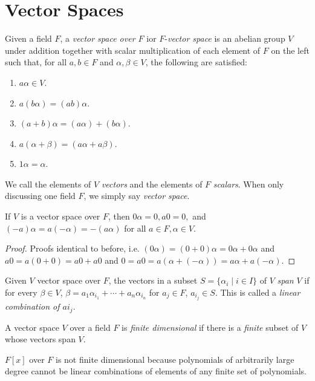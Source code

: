 \section{Vector Spaces}

\begin{definition}
    Given a field $F$, a \emph{vector space over $F$} ior $F$-\emph{vector space} is an abelian group $V$ under addition together with scalar multiplication of each element of $F$ on the left such that, for all $a,b \in F$ and $\alpha, \beta \in V$, the following are satisfied:
    \begin{enumerate}[label = ($\mathscr{V}_{\arabic*}$)]
        \item $a\alpha \in V$.
        \item $a(b\alpha) = (ab)\alpha$.
        \item $(a+b)\alpha = (a\alpha) + (b\alpha)$.
        \item $a(\alpha+\beta) = (a\alpha + a\beta)$.
        \item $1\alpha = \alpha$.
    \end{enumerate}
    We call the elements of $V$ \emph{vectors} and the elements of $F$ \emph{scalars}. When only discussing one field $F$, we simply say \emph{vector space}.
\end{definition}
\begin{theorem}
    If $V$ is a vector space over $F$, then $0\alpha = 0, a0 = 0,$ and $(-a)\alpha = a(-\alpha) = -(a\alpha)$ for all $a \in F, \alpha \in V$.
\end{theorem}
\begin{proof}
    Proofs identical to before, i.e. $(0\alpha) = (0+0)\alpha = 0\alpha + 0\alpha$ and $a0 = a(0+0) = a0 + a0$ and $0 = a0 = a(\alpha + (-\alpha)) = a\alpha + a(-\alpha)$.
\end{proof}
\begin{definition}[Span]
    Given $V$ vector space over $F$, the vectors in a subset $S = \{\alpha_i\mid i \in I\}$ of $V$ \emph{span} $V$ if for every $\beta \in V$, $\beta = a_1\alpha_{i_1} + \cdots + a_n\alpha_{i_n}$ for $a_j \in F$, $a_{i_j} \in S$. This is called a \emph{linear combination of $a{i_j}$}.
\end{definition}
\begin{definition}
    A vector space $V$ over a field $F$ is \emph{finite dimensional} if there is a \emph{finite} subset of $V$ whose vectors span $V$.
\end{definition}
\begin{example}
    $F[x]$ over $F$ is not finite dimensional because polynomials of arbitrarily large degree cannot be linear combinations of elements of any finite set of polynomials.
\end{example}
